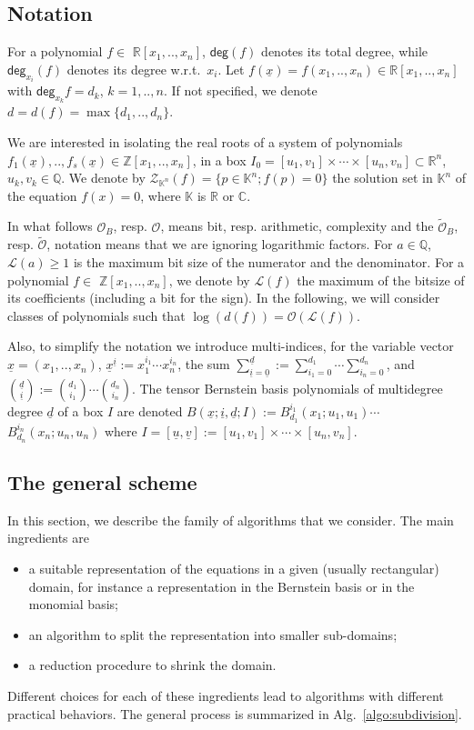 \documentclass{sig-alternate}
\newcommand{\ds}{\displaystyle}
\newcommand{\dott}{{..}}
\def\CC{{\mathbb C}} \def\NN{{\mathbb N}} \def\PP{{\mathbb P}}
\def\QQ{{\mathbb Q}} \def\RR{{\mathbb R}} \def\ZZ{{\mathbb Z}}
\def\QQ{\mathbb{Q}}
\def\kk{\mathbb{K}}
\def\RR{\mathbb{R}}
\newcommand{\OO}{\ensuremath{\mathcal{O}}\xspace}
\newcommand{\sO}{\ensuremath{\widetilde{\mathcal{O}}}\xspace}
\newcommand{\OB}{\ensuremath{\mathcal{O}_B}\xspace}
\newcommand{\sOB}{\ensuremath{\widetilde{\mathcal{O}}_B}\xspace}
\newcommand{\uvec}[1]{\underline{#1}}
\newcommand{\dg}{\ensuremath{\mathsf{deg}}\xspace}
\newcommand{\bitsize}[1]{\ensuremath{\mathcal{L}\left( #1 \right)}\xspace}
\begin{document}
\subsection{Notation}

For a polynomial $f \in$ $\RR[x_1, \dott, x_n]$, $\dg( f)$ denotes its
total degree, while $\dg_{x_i}(f)$ denotes its degree w.r.t.~$x_i$.
Let $f(\uvec x)=f(x_1,\dott, x_n )\in \RR[x_1,\dott, x_n]$ with $\dg_{x_k} f =
d_k$, $k=1,\dott,n$. 
If not specified, we denote $d=d(f)=\max\{d_1,\dott,d_n\}$.

We are interested in isolating the real roots of a system of polynomials 
$f_{1}(\uvec x), \dott, f_{s}(\uvec x)\in \ZZ[x_{1}, \dott, x_{n}]$, in a
box $I_{0}= [u_1,v_1]\times\cdots \times [u_n, v_n] \subset \RR^n$, $u_k,v_k\in\QQ$. 
We denote by $\mathcal{Z}_{\kk^{n}}(f)=\{ p\in \kk^{n}; f(p)=0\}$ the solution
set in $\kk^{n}$  of the equation $f(x)=0$, where $\kk$ is $\RR$ or $\CC$.

In what follows \OB, resp. \OO, means bit, resp. arithmetic,
complexity and the \sOB, resp. \sO, notation means that we are
ignoring logarithmic factors.
For $a \in \QQ$, $\bitsize{ a} \ge 1$ is the maximum bit size of the
numerator and the denominator.  For a polynomial $f \in$ $\ZZ[x_1,
\dott, x_n]$, we denote by \bitsize{f} the maximum of the bitsize of
its coefficients (including a bit for the sign).  In the following, we
will consider classes of polynomials such that $\log( d(f) ) = \OO(
\bitsize{f})$.



Also, to simplify the notation we introduce multi-indices, for the
variable vector $\uvec x=(x_1,\dott,x_n)$, $\uvec x^{\uvec i}
:= x_1^{i_1}\cdots x_n^{i_n}$, the sum $\ds \sum_{\uvec i= \uvec 0}^{\uvec
  d}:= \sum_{i_1=0}^{d_1}\cdots\sum_{i_n=0}^{d_n}$, and $\ds \binom{\uvec
  d}{\uvec i} := \binom{d_1}{i_1}\cdots \binom{d_n}{i_n} $.
The tensor Bernstein basis polynomials of multidegree degree $\uvec d$
of a box $I$ are denoted $\ds B(\uvec x; \uvec i, \uvec d; I) :=
B_{d_1}^{i_1}(x_1; u_1,u_1)\cdots$ $B_{d_n}^{i_n}(x_n;u_n,u_n)$ where
$I= [\uvec u,\uvec v]:=[u_1,v_1]\times\cdots\times[u_n,v_n]$.


\subsection{The general scheme}   

In this section, we describe the family of algorithms that we consider.
The main ingredients are 
\begin{itemize}
 \item  a suitable representation of the equations in a given (usually
rectangular) domain, for instance a representation in the Bernstein
basis or in the monomial basis;
 \item an algorithm to split the
representation into smaller sub-domains;
 \item a reduction procedure to
shrink the domain.
\end{itemize}
Different choices for each of these ingredients lead to algorithms
with different practical behaviors. The general process is summarized
in Alg.~\ref{algo:subdivision}.
\end{document}
